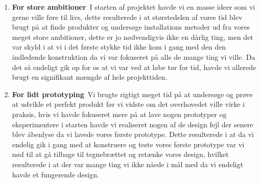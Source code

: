     \begin{enumerate}
        \item \textbf{For store ambitioner}\
            I starten af projektet havde vi en masse ideer som vi gerne ville føre til livs, dette resulterede i at størstedelen af vores tid blev
            brugt på at finde produkter og undersøge installations metoder ud fra vores meget store ambitioner, dette er jo nødvendigvis ikke en
            dårlig ting, men det var skyld i at vi i det første stykke tid ikke kom i gang med den den indledende konstruktion
            da vi var fokuseret på alle de mange ting vi ville. Da det så endeligt gik op for os at vi var ved at løbe tør for
            tid, havde vi allerede brugt en signifikant mængde af hele projekttiden.
        \item \textbf{For lidt prototyping}\
            Vi brugte rigtigt meget tid på at undersøge og prøve at udvikle et perfekt produkt før vi vidste om det overhovedet ville virke i
            praksis, hvis vi havde fokuseret mere på at lave nogen prototyper og eksperimentere i starten havde vi realiseret nogen af de
            design fejl der senere blev åbenlyse da vi lavede vores første prototype. Dette resulterede i at da vi endelig gik i gang med at
            konstruere og teste vores første prototype var vi nød til at gå tilbage til tegnebrættet og retænke vores design, hvilket
            resulterede i at der var mange ting vi ikke nåede i mål med da vi endeligt havde et fungerende design.
    \end{enumerate}
    
